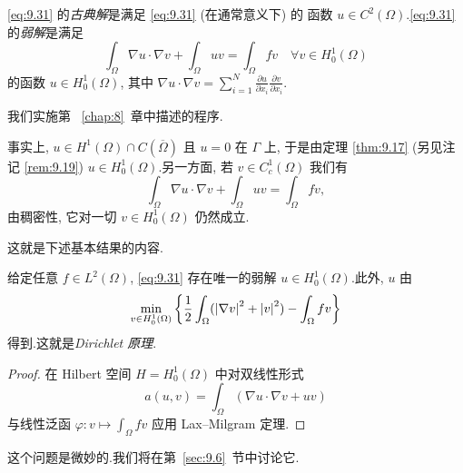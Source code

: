 \begin{definition}
\eqref{eq:9.31} 的\emph{古典解}是满足 \eqref{eq:9.31} (在通常意义下) 的
函数 $u\in C^2(\Omega)$.\eqref{eq:9.31} 的\emph{弱解}是满足
\begin{equation}
\int_\Omega\nabla u\cdot\nabla v+\int_\Omega uv=\int_\Omega fv
\quad\forall v\in H_0^1(\Omega)
\label{eq:9.32}
\end{equation}
的函数 $u\in H_0^1(\Omega)$, 其中
$\nabla u\cdot\nabla v=\sum_{i=1}^N\frac{\partial u}{\partial x_i}
\frac{\partial v}{\partial x_i}$.
\end{definition}

我们实施第~
\ref{chap:8}~章中描述的程序.


事实上, $u\in H^1(\Omega)\cap C(\overline\Omega)$ 且 $u=0$ 在 $\Gamma$ 上,
于是由定理  \ref{thm:9.17} (另见注记 \ref{rem:9.19})
$u\in H_0^1(\Omega)$.另一方面, 若 $v\in C_c^1(\Omega)$ 我们有
\begin{equation*}
\int_\Omega\nabla u\cdot\nabla v+\int_\Omega uv=\int_\Omega fv,
\end{equation*}
由稠密性, 它对一切 $v\in H_0^1(\Omega)$ 仍然成立.


这就是下述基本结果的内容.

\begin{keytheorem}
\label{thm:9.21}
给定任意 $f\in L^2(\Omega)$, \eqref{eq:9.31} 存在唯一的弱解
$u\in H_0^1(\Omega)$.此外, $u$ 由
\begin{equation*}
\min_{v\in H_0^1(\Omega)}\left\{\frac12\int_\Omega
(\left|\nabla v\right|^2+\left|v\right|^2)-\int_\Omega fv\right\}
\end{equation*}
得到.这就是\emph{Dirichlet 原理}.
\end{keytheorem}

\begin{proof}
在 Hilbert 空间 $H=H_0^1(\Omega)$ 中对双线性形式
\begin{equation*}
a(u,v)=\int_\Omega(\nabla u\cdot\nabla v+uv)
\end{equation*}
与线性泛函 $\varphi:v\mapsto\int_\Omega fv$ 应用 Lax--Milgram 定理.
\end{proof}


这个问题是微妙的.我们将在第~\ref{sec:9.6}~节中讨论它.

